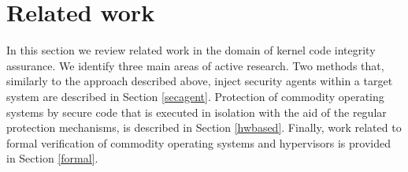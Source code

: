 



\clearpage

\section{Related work}\label{hf:related}
In this section we review related work in the domain of kernel code integrity assurance. We identify three main areas of active research. Two methods that, similarly to the approach described above, inject security agents within a target system are described in Section \ref{secagent}. Protection of commodity operating systems by secure code that is executed in isolation with the aid of the regular protection mechanisms, is described in Section \ref{hwbased}. Finally, work related to formal verification of commodity operating systems and hypervisors is provided in Section \ref{formal}.


%


